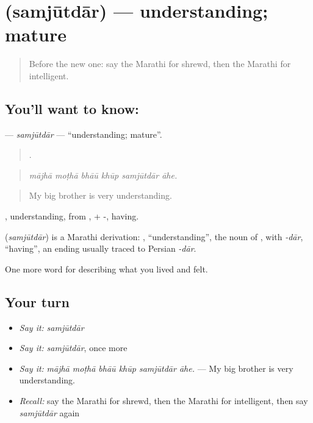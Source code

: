\section[\texorpdfstring{\mr{समजूतदार} (samjūtdār)}{समजूतदार (samjūtdār)}]{ (samjūtdār) — understanding; mature}

\label{lesson:MR-C471-samjutdar}



\begin{quote}
Before the new one: say the Marathi for shrewd, then the Marathi for intelligent.
\end{quote}

\subsection*{You'll want to know: }
\textbf{} — \emph{samjūtdār} — \textquotedblleft{}understanding; mature\textquotedblright{}.

\begin{quote}
     .
\end{quote}

\begin{quote}
\emph{mājhā moṭhā bhāū khūp samjūtdār āhe.}
\end{quote}

\begin{quote}
My big brother is very understanding.
\end{quote}

, understanding, from , + -, having.

\begin{cousinweb}
\textbf{} (\emph{samjūtdār}) is a Marathi derivation: , \textquotedblleft{}understanding\textquotedblright{}, the noun of , with \emph{-dār}, \textquotedblleft{}having\textquotedblright{}, an ending usually traced to Persian \emph{-dār}.
\end{cousinweb}

\begin{grammarlens}[title={What you've built}]
One more word for describing what you lived and felt.
\end{grammarlens}

\subsection*{Your turn}
\begin{itemize}
\raggedright
  \item \emph{Say it:} \emph{samjūtdār}
  \item \emph{Say it:} \emph{samjūtdār}, once more
  \item \emph{Say it:} \emph{mājhā moṭhā bhāū khūp samjūtdār āhe.} — My big brother is very understanding.
  \item \emph{Recall:} say the Marathi for shrewd, then the Marathi for intelligent, then say \emph{samjūtdār} again
\end{itemize}

